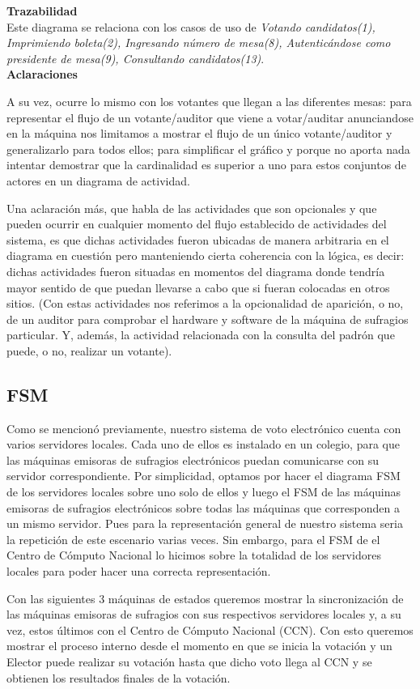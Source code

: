 \documentclass[spanish, 10pt,a4paper]{article}
\numberwithin{equation}{section} %
\begin{document}
\noindent\textbf{Trazabilidad}\\

Este diagrama se relaciona con los casos de uso de \textit{Votando candidatos(1), Imprimiendo boleta(2), Ingresando número de mesa(8), Autenticándose como presidente de mesa(9), Consultando candidatos(13)}.\\

\noindent\textbf{Aclaraciones}\\

\par 
A su vez, ocurre lo mismo con los votantes que llegan a las diferentes mesas: para representar el flujo de un votante/auditor que viene a votar/auditar anunciandose en la m\'aquina nos limitamos a mostrar el flujo de un \'unico votante/auditor y generalizarlo para todos ellos; para simplificar el gr\'afico y porque no aporta nada intentar demostrar que la cardinalidad es superior a uno para estos conjuntos de actores en un diagrama de actividad. 
\par
Una aclaraci\'on m\'as, que habla de las actividades que son opcionales y que pueden ocurrir en cualquier momento del flujo establecido de actividades del sistema, es que dichas actividades fueron ubicadas de manera arbitraria en el diagrama en cuesti\'on pero manteniendo cierta coherencia con la l\'ogica, es decir: dichas actividades fueron situadas en momentos del diagrama donde tendr\'ia mayor sentido de que puedan llevarse a cabo que si fueran colocadas en otros sitios. (Con estas actividades nos referimos a la opcionalidad de aparici\'on, o no, de un auditor para comprobar el hardware y software de la m\'aquina de sufragios particular. Y, adem\'as, la actividad relacionada con la consulta del padr\'on que puede, o no, realizar un votante).


\subsection{FSM}
Como se mencionó previamente, nuestro sistema de voto electr\'onico cuenta con varios servidores locales. Cada uno de ellos es instalado en un colegio, para que las m\'aquinas emisoras de sufragios electr\'onicos puedan comunicarse con su servidor correspondiente. Por simplicidad, optamos por hacer el diagrama FSM de los servidores locales sobre uno solo de ellos y luego el FSM de las m\'aquinas emisoras de sufragios electr\'onicos sobre todas las m\'aquinas que corresponden a un mismo servidor. Pues para la representación general de nuestro sistema seria la repetici\'on de este escenario varias veces. Sin embargo, para el FSM de el Centro de Cómputo Nacional lo hicimos sobre la totalidad de los servidores locales para poder hacer una correcta representaci\'on.\\
\par
Con las siguientes 3 máquinas de estados queremos mostrar la sincronización de las máquinas emisoras de sufragios con sus respectivos servidores locales y, a su vez, estos últimos con el Centro de Cómputo Nacional (CCN). Con esto queremos mostrar el proceso interno desde el momento en que se inicia la votación y un Elector puede realizar su votación hasta que dicho voto llega al CCN y se obtienen los resultados finales de la votación.
\end{document}
